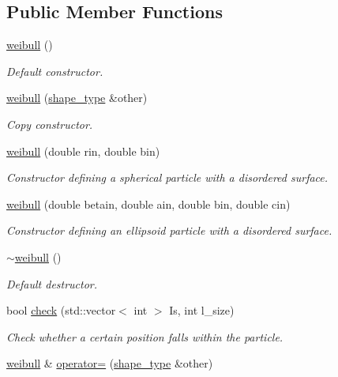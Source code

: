\subsection*{Public Member Functions}
\begin{DoxyCompactItemize}
\item 
\hyperlink{classweibull_a13e0eeb81eba0c398a670408594220fb}{weibull} ()
\begin{DoxyCompactList}\small\item\em Default constructor. \end{DoxyCompactList}\item 
\hyperlink{classweibull_a2f88db897dc8ad0b27eade6a6379f741}{weibull} (\hyperlink{classshape__type}{shape\+\_\+type} \&other)
\begin{DoxyCompactList}\small\item\em Copy constructor. \end{DoxyCompactList}\item 
\hyperlink{classweibull_a3fd3fba13fdbfd558af425ff7effc087}{weibull} (double rin, double bin)
\begin{DoxyCompactList}\small\item\em Constructor defining a spherical particle with a disordered surface. \end{DoxyCompactList}\item 
\hyperlink{classweibull_a89e2d0c1e9f6481f7976f13e338ea396}{weibull} (double betain, double ain, double bin, double cin)
\begin{DoxyCompactList}\small\item\em Constructor defining an ellipsoid particle with a disordered surface. \end{DoxyCompactList}\item 
\hyperlink{classweibull_a3622160a85fb31ec2efe68900ce0beb7}{$\sim$weibull} ()
\begin{DoxyCompactList}\small\item\em Default destructor. \end{DoxyCompactList}\item 
bool \hyperlink{classweibull_af534b7b7328d50e9f7e4d61b8f961d61}{check} (std\+::vector$<$ int $>$ Is, int l\+\_\+size)
\begin{DoxyCompactList}\small\item\em Check whether a certain position falls within the particle. \end{DoxyCompactList}\item 
\hyperlink{classweibull}{weibull} \& \hyperlink{classweibull_ad30b152a6b09ee3727ccca240aae79db}{operator=} (\hyperlink{classshape__type}{shape\+\_\+type} \&other)

\end{DoxyCompactItemize}

